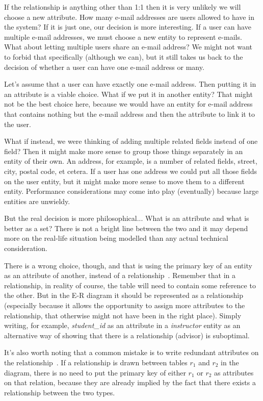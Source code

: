If the relationship is anything other than 1:1 then it is very unlikely we will choose a new attribute. How many e-mail addresses are users allowed to have in the system? If it is just one, our decision is more interesting. If a user can have multiple e-mail addresses, we must choose a new entity to represent e-mails. What about letting multiple users share an e-mail address? We might not want to forbid that specifically (although we can), but it still takes us back to the decision of whether a user can have one e-mail address or many.

Let's assume that a user can have exactly one e-mail address. Then putting it in an attribute is a viable choice. What if we put it in another entity? That might not be the best choice here, because we would have an entity for e-mail address that contains nothing but the e-mail address and then the attribute to link it to the user. 

What if instead, we were thinking of adding multiple related fields instead of one field? Then it might make more sense to group those things separately in an entity of their own. An address, for example, is a number of related fields, street, city, postal code, et cetera. If a user has one address we could put all those fields on the user entity, but it might make more sense to move them to a different entity. Performance considerations may come into play (eventually) because large entities are unwieldy. 

But the real decision is more philosophical... What is an attribute and what is better as a set? There is not a bright line between the two and it may depend more on the real-life situation being modelled than any actual technical consideration.

There is a wrong choice, though, and that is using the primary key of an entity as an attribute of another, instead of a relationship~\cite{dsc}. Remember that in a relationship, in reality of course, the table will need to contain some reference to the other. But in the E-R diagram it should be represented as a relationship (especially because it allows the opportunity to assign more attributes to the relationship, that otherwise might not have been in the right place). Simply writing, for example, \textit{student\_id} as an attribute in a \textit{instructor} entity as an alternative way of showing that there is a relationship (advisor) is suboptimal.

It's also worth noting that a common mistake is to write redundant attributes on the relationship~\cite{dsc}. If a relationship is drawn between tables $r_{1}$ and $r_{2}$ in the diagram, there is no need to put the primary key of either $r_{1}$ or $r_{2}$ as attributes on that relation, because they are already implied by the fact that there exists a relationship between the two types. 

